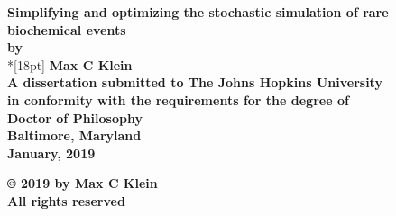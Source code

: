 \documentclass[12pt]{report}
\begin{document}
\newcommand{\bm}[1]{ \mbox{\boldmath $ #1 $} }
\newcommand{\bin}[2]{\left(\begin{array}{@{}c@{}} #1 \\ #2
             \end{array}\right) }
\renewcommand{\contentsname}{Table of Contents}
\baselineskip=24pt
 
\thispagestyle{empty}
\begin{center}
\vspace*{.25in}
{\bf\LARGE{ Simplifying and optimizing the stochastic simulation of rare biochemical events }}\\ %
\vspace*{.75in}
{\bf by} \\*[18pt]
\vspace*{.2in}
{\bf Max C Klein}\\ %
\vspace*{1in}
{\bf A dissertation submitted to The Johns Hopkins University\\
in conformity with the requirements for the degree of\\
Doctor of Philosophy }\\
\vspace*{.75in}
{\bf Baltimore, Maryland} \\
{\bf January, 2019} \\     %
\vspace*{.5in}
\begin{small}
{\bf \copyright{ }2019 by Max C Klein} \\ %
{\bf All rights reserved}
\end{small}
\end{center}
\newpage 

\pagestyle{plain}
\setcounter{page}{2}

%


\pagestyle{plain}
\baselineskip=24pt
\tableofcontents
\listoftables
\listoffigures

\cleardoublepage %

\begin{refsection}

\cleardoublepage
{}
\printbibliography[title={References}]
\end{refsection}
\end{document}
